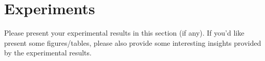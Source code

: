 \section{Experiments}
\label{section:exp}
Please present your experimental results in this section (if any). If you'd like present some figures/tables, please also provide some interesting insights provided by the experimental results.